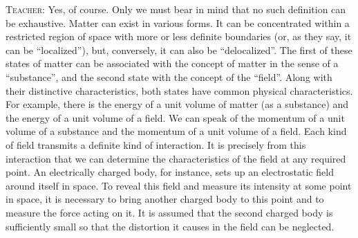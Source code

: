 \documentclass[a4paper,sfsidenotes]{tufte-book}
\begin{document}
\textsc{Teacher:} Yes, of course. Only we must bear in mind that no such definition can be exhaustive. Matter can exist in various forms. It can be concentrated within a restricted region of space with more or less definite boundaries (or, as they say, it can be ``localized''), but, conversely, it can also be ``delocalized''. The first of these states of matter can be associated with the concept of matter in the sense of a ``substance'', and the second state with the concept of the ``field''. Along with their distinctive characteristics, both states have common physical characteristics. For example, there is the energy of a unit volume of matter (as a substance) and the energy of a unit volume of a field. We can speak of the momentum of a unit volume of a substance and the momentum of a unit volume of a field. Each kind of field transmits a definite kind of interaction. It is precisely from this interaction that we can determine the characteristics of the field at any required point. An electrically charged body, for instance, sets up an electrostatic field around itself in space. To reveal this field and measure its intensity at some point in space, it is necessary to bring another charged body to this point and to measure the force acting on it. It is assumed that the second charged body is sufficiently small so that the distortion it causes in the field can be neglected.
\end{document}
